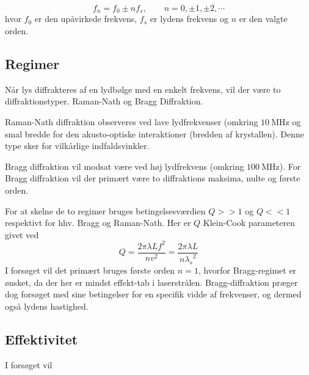 \documentclass[main]{subfiles}
\begin{document}
\begin{equation}
    f_n = f_0 \pm nf_s, \qquad n=0, \pm1, \pm2, \cdots
    \label{eq:frequence}
\end{equation}
hvor $f_0$ er den upåvirkede frekvens, $f_s$ er lydens frekvens og $n$ er den valgte orden. 

\subsection{Regimer}
Når lys diffrakteres af en lydbølge med en enkelt frekvens, vil der være to diffraktionstyper. Raman-Nath og Bragg Diffraktion.

Raman-Nath diffraktion observeres ved lave lydfrekvenser (omkring $\SI{10}{\mega\hertz}$ og smal bredde for den akusto-optiske interaktioner (bredden af krystallen). Denne type sker for vilkårlige indfaldsvinkler.

    Bragg diffraktion vil modsat være ved høj lydfrekvens (omkring $\SI{100}{\mega\hertz}$). For Bragg diffraktion vil der primært være to diffraktions maksima, nulte og første orden.

    For at skelne de to regimer bruges betingelsesværdien $Q>>1$ og $Q<<1$ respektivt for hhv. Bragg og Raman-Nath. Her er $Q$ Klein-Cook parameteren givet ved
    \begin{equation}
    Q = \frac{2\pi\lambda L f^2}{nv^2}=\frac{2\pi\lambda L}{n{\lambda_s}^2}
        \label{eq:KleinCook}
    \end{equation}
I forsøget vil det primært bruges første orden $n=1$, hvorfor Bragg-regimet er ønsket, da der her er mindst effekt-tab i laserstrålen. Bragg-diffraktion præger dog forsøget med sine betingelser for en specifik vidde af frekvenser, og dermed også lydens hastighed.


\subsection{Effektivitet}
I forsøget vil 
\end{document}
